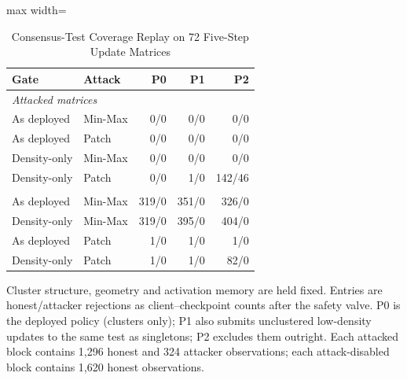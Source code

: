 \begin{table}[!t]
\centering\footnotesize
\setlength{\tabcolsep}{4pt}
\caption{Consensus-Test Coverage Replay on 72 Five-Step Update Matrices}\label{tab:coverage_replay}
\begin{adjustbox}{max width=\columnwidth}
\begin{tabular}{llrrr}
\toprule
Gate & Attack & P0 & P1 & P2 \\
\midrule
\multicolumn{5}{l}{\emph{Attacked matrices}} \\
\quad As deployed & Min-Max & 0/0 & 0/0 & 0/0 \\
\quad As deployed & Patch & 0/0 & 0/0 & 0/0 \\
\quad Density-only & Min-Max & 0/0 & 0/0 & 0/0 \\
\quad Density-only & Patch & 0/0 & 1/0 & 142/46 \\
\addlinespace[3pt]
\multicolumn{5}{l}{\emph{Attack-disabled controls}} \\
\quad As deployed & Min-Max & 319/0 & 351/0 & 326/0 \\
\quad Density-only & Min-Max & 319/0 & 395/0 & 404/0 \\
\quad As deployed & Patch & 1/0 & 1/0 & 1/0 \\
\quad Density-only & Patch & 1/0 & 1/0 & 82/0 \\
\bottomrule
\end{tabular}
\end{adjustbox}

\par\vspace{3pt}\parbox{\linewidth}{\footnotesize Cluster structure, geometry and activation memory are held fixed. Entries are honest/attacker rejections as client--checkpoint counts after the safety valve. P0 is the deployed policy (clusters only); P1 also submits unclustered low-density updates to the same test as singletons; P2 excludes them outright. Each attacked block contains 1{,}296 honest and 324 attacker observations; each attack-disabled block contains 1{,}620 honest observations.}
\end{table}
